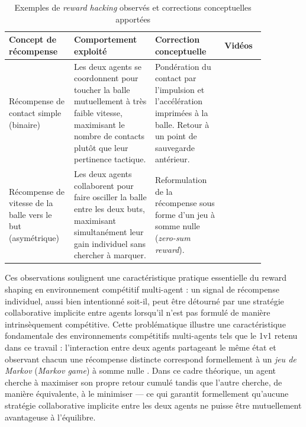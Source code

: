 \begin{table}[h]

\caption{Exemples de \textit{reward hacking} observés et corrections conceptuelles apportées}
\label{tab:reward_hacking}
\centering
\begin{tabular}{|p{0.20\linewidth}|p{0.28\linewidth}|p{0.24\linewidth}|p{0.14\linewidth}|}
\hline
\textbf{Concept de récompense} & \textbf{Comportement exploité} & \textbf{Correction conceptuelle} & \textbf{Vidéos} \\
\hline
Récompense de contact simple (binaire) & 
Les deux agents se coordonnent pour toucher la balle mutuellement à très faible vitesse, maximisant le nombre de contacts plutôt que leur pertinence tactique. &
Pondération du contact par l'impulsion et l'accélération imprimées à la balle. Retour à un point de sauvegarde antérieur. &
\parencite{davidplnmrRLGymTouchRewardHacking2026} \\
\hline
Récompense de vitesse de la balle vers le but (asymétrique) &
Les deux agents collaborent pour faire osciller la balle entre les deux buts, maximisant simultanément leur gain individuel sans chercher à marquer. &
Reformulation de la récompense sous forme d'un jeu à somme nulle (\textit{zero-sum reward}). &
\parencite{davidplnmrRLGymTouchRewardVelocityBallToGoal2026} \\
\hline
\end{tabular}

\end{table}

Ces observations soulignent une caractéristique pratique essentielle du reward shaping en environnement compétitif multi-agent : un signal de récompense individuel, aussi bien intentionné soit-il, peut être détourné par une stratégie collaborative implicite entre agents lorsqu'il n'est pas formulé de manière intrinsèquement compétitive. Cette problématique illustre une caractéristique fondamentale des environnements compétitifs multi-agents tels que le 1v1 retenu dans ce travail : l'interaction entre deux agents partageant le même état et observant chacun une récompense distincte correspond formellement à un \textit{jeu de Markov} (\textit{Markov game}) à somme nulle \parencite{littmanMarkovGamesFramework1994}. Dans ce cadre théorique, un agent cherche à maximiser son propre retour cumulé tandis que l'autre cherche, de manière équivalente, à le minimiser — ce qui garantit formellement qu'aucune stratégie collaborative implicite entre les deux agents ne puisse être mutuellement avantageuse à l'équilibre.

